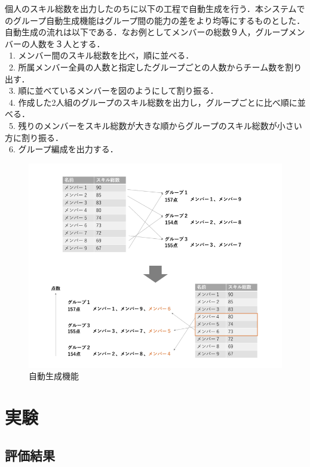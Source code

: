 \documentclass{funthesis}
\begin{document}
個人のスキル総数を出力したのちに以下の工程で自動生成を行う．本システムでのグループ自動生成機能はグループ間の能力の差をより均等にするものとした．自動生成の流れは以下である．なお例としてメンバーの総数９人，グループメンバーの人数を３人とする．\\
\ 1. メンバー間のスキル総数を比べ，順に並べる．\\
\ 2. 所属メンバー全員の人数と指定したグループごとの人数からチーム数を割り出す．\\
\ 3. 順に並べているメンバーを図のようにして割り振る．\\
\ 4. 作成した2人組のグループのスキル総数を出力し，グループごとに比べ順に並べる．\\
\ 5. 残りのメンバーをスキル総数が大きな順からグループのスキル総数が小さい方に割り振る．\\
\ 6. グループ編成を出力する．\\
\begin{figure}[h]
 \centering
   \includegraphics[width=150mm]{figures/auto.png}
 \caption{自動生成機能}
 \label{auto}
\end{figure}





\chapter{実験}

\section{評価結果}
\end{document}
